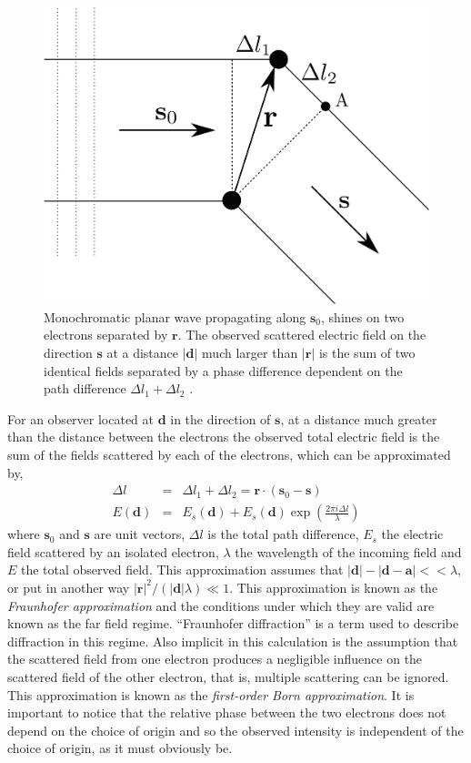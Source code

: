\begin{figure}[h]
\begin{center}
\includegraphics[width=0.7 \columnwidth]{Diffraction_Theory/two_electrons.png}
\end{center}
\caption{Monochromatic planar wave propagating along $\mathbf s_0$, shines on two
  electrons separated by $\mathbf r$. The observed scattered electric field on the
  direction $\mathbf s$ at a distance $| \mathbf d|$ much larger than $|\mathbf r|$ is the
  sum of two identical fields separated by a phase difference dependent on the
  path difference $\Delta l_1 + \Delta l_2$ \cite{2001International}.}
\label{Fig:two_electrons}
\end{figure}
For an observer located at $\mathbf d$ in the direction of $\mathbf s$, at a distance
much greater than the distance between the electrons the observed total electric
field is the sum of the fields scattered by each of the electrons, which can be
approximated by,
\begin{eqnarray}
\Delta l & = & \Delta l_1 + \Delta l_2 = \mathbf r \cdot (\mathbf s_0 - \mathbf s)\\
E(\mathbf d) & = & E_s(\mathbf d) + E_s(\mathbf d) \exp(\frac{2 \pi i \Delta
  l}{\lambda})
\label{Eq:ScatteringTwoElectrons}
\end{eqnarray}
where $\mathbf s_0$ and $\mathbf s$ are unit vectors, $\Delta l$ is the total path
difference, $E_s$ the electric field scattered by an isolated electron, $\lambda$
the wavelength of the incoming field and $E$ the total observed field.
This approximation assumes that $|\mathbf d| -
|\mathbf d- \mathbf a| << \lambda$, or put in another way $|\mathbf r|^2/(|\mathbf d| \lambda) \ll
1 $. This approximation is known as the {\em Fraunhofer approximation} and the conditions
under which they are valid are known as the far field regime. ``Fraunhofer
diffraction'' is a term used to describe diffraction in this regime. Also implicit
in this calculation is the assumption that the scattered field from one electron produces a
negligible influence on the scattered field of the other electron, that is, multiple
scattering can be ignored. This approximation is known as the {\em first-order Born
  approximation}.
It is
important to notice that the relative phase between the two electrons does not
depend on the choice of origin and so the observed intensity is independent of
the choice of origin, as it must obviously be. 


